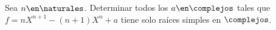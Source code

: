 \ejercicio

Sea $n \en \naturales$. Determinar todos los $a \en \complejos$ tales que
$f = nX^{n+1} - (n+1)X^n + a$ tiene solo raíces simples en $\complejos$.

\separadorCorto
{}
 
